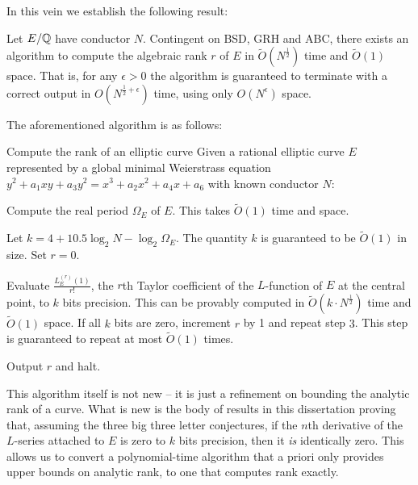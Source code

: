 \documentclass[10pt]{article}
\begin{document}
In this vein we establish the following result:
\begin{theorem}\label{thm:main_theorem}
Let $E/\mathbb{Q}$ have conductor $N$. Contingent on BSD, GRH and ABC, there exists an algorithm to compute the algebraic rank $r$ of $E$ in $\tilde{O}(N^{\frac{1}{2}})$ time and $\tilde{O}(1)$ space. That is, for any $\epsilon>0$ the algorithm is guaranteed to terminate with a correct output in $O(N^{\frac{1}{2}+\epsilon})$ time, using only $O(N^{\epsilon})$ space.
\end{theorem}
The aforementioned algorithm is as follows:
\begin{algorithm}{Compute the rank of an elliptic curve}\label{algo:compute_rank}
Given a rational elliptic curve $E$ represented by a global minimal Weierstrass equation $y^2 + a_1 xy + a_3 y^2 = x^3 + a_2 x^2 + a_4 x + a_6$ with known conductor $N$:
\begin{steps}
\item Compute the real period $\Omega_E$ of $E$. This takes $\tilde{O}(1)$ time and space.
\item Let $k = 4 + 10.5 \log_2 N - \log_2 \Omega_E$. The quantity $k$ is guaranteed to be $\tilde{O}(1)$ in size. Set $r=0$.
\item Evaluate $\frac{L_E^{(r)}(1)}{r!}$, the $r$th Taylor coefficient of the $L$-function of $E$ at the central point, to $k$ bits precision. This can be provably computed in $\tilde{O}(k\cdot N^{\frac{1}{2}})$ time and $\tilde{O}(1)$ space. If all $k$ bits are zero, increment $r$ by 1 and repeat step $3$. This step is guaranteed to repeat at most $\tilde{O}(1)$ 	times.
\item Output $r$ and halt.
\end{steps}
\end{algorithm}

This algorithm itself is not new -- it is just a refinement on bounding the analytic rank of a curve. What is new is the body of results in this dissertation proving that, assuming the three big three letter conjectures, if the $n$th derivative of the $L$-series attached to $E$ is zero to $k$ bits precision, then it {\it is} identically zero. This allows us to convert a polynomial-time algorithm that a priori only provides upper bounds on analytic rank, to one that computes rank exactly.\\
\end{document}
